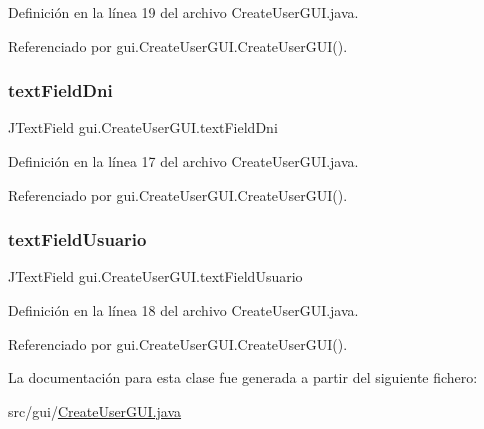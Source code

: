 Definición en la línea 19 del archivo Create\+User\+G\+U\+I.\+java.



Referenciado por gui.\+Create\+User\+G\+U\+I.\+Create\+User\+G\+U\+I().

\mbox{\label{classgui_1_1CreateUserGUI_a5ed1279425631f9ce5630d3a7e38e795}} 
\subsubsection{\texorpdfstring{textFieldDni}{textFieldDni}}
{\footnotesize\ttfamily J\+Text\+Field gui.\+Create\+User\+G\+U\+I.\+text\+Field\+Dni\hspace{0.3cm}{\ttfamily [private]}}



Definición en la línea 17 del archivo Create\+User\+G\+U\+I.\+java.



Referenciado por gui.\+Create\+User\+G\+U\+I.\+Create\+User\+G\+U\+I().

\mbox{\label{classgui_1_1CreateUserGUI_a4e740cefebabdcde4027964a4bd6cba7}} 
\subsubsection{\texorpdfstring{textFieldUsuario}{textFieldUsuario}}
{\footnotesize\ttfamily J\+Text\+Field gui.\+Create\+User\+G\+U\+I.\+text\+Field\+Usuario\hspace{0.3cm}{\ttfamily [private]}}



Definición en la línea 18 del archivo Create\+User\+G\+U\+I.\+java.



Referenciado por gui.\+Create\+User\+G\+U\+I.\+Create\+User\+G\+U\+I().



La documentación para esta clase fue generada a partir del siguiente fichero\+:\begin{DoxyCompactItemize}
\item 
src/gui/\mbox{\hyperlink{CreateUserGUI_8java}{Create\+User\+G\+U\+I.\+java}}\end{DoxyCompactItemize}
